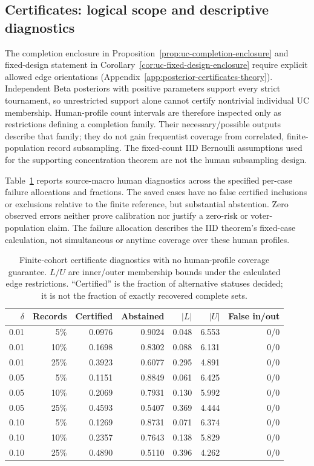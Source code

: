 \subsection{Certificates: logical scope and descriptive diagnostics}
The completion enclosure in Proposition~\ref{prop:uc-completion-enclosure} and fixed-design statement in Corollary~\ref{cor:uc-fixed-design-enclosure} require explicit allowed edge orientations (Appendix~\ref{app:posterior-certificates-theory}). Independent Beta posteriors with positive parameters support every strict tournament, so unrestricted support alone cannot certify nontrivial individual UC membership. Human-profile count intervals are therefore inspected only as restrictions defining a completion family. Their necessary/possible outputs describe that family; they do not gain frequentist coverage from correlated, finite-population record subsampling. The fixed-count IID Bernoulli assumptions used for the supporting concentration theorem are not the human subsampling design.

Table~\ref{tab:posterior-native-certificates} reports source-macro human diagnostics across the specified per-case failure allocations and fractions. The saved cases have no false certified inclusions or exclusions relative to the finite reference, but substantial abstention. Zero observed errors neither prove calibration nor justify a zero-risk or voter-population claim. The failure allocation describes the IID theorem's fixed-case calculation, not simultaneous or anytime coverage over these human profiles.
\begin{table}[ht]\centering\footnotesize
\begin{tabular*}{\linewidth}{@{\extracolsep{\fill}}rrrrrrr@{}}\toprule
$\delta$ & Records & Certified & Abstained & $|L|$ & $|U|$ & False in/out\\\midrule
0.01 & 5\% & 0.0976 & 0.9024 & 0.048 & 6.553 & 0/0\\
0.01 & 10\% & 0.1698 & 0.8302 & 0.088 & 6.131 & 0/0\\
0.01 & 25\% & 0.3923 & 0.6077 & 0.295 & 4.891 & 0/0\\
0.05 & 5\% & 0.1151 & 0.8849 & 0.061 & 6.425 & 0/0\\
0.05 & 10\% & 0.2069 & 0.7931 & 0.130 & 5.992 & 0/0\\
0.05 & 25\% & 0.4593 & 0.5407 & 0.369 & 4.444 & 0/0\\
0.10 & 5\% & 0.1269 & 0.8731 & 0.071 & 6.374 & 0/0\\
0.10 & 10\% & 0.2357 & 0.7643 & 0.138 & 5.829 & 0/0\\
0.10 & 25\% & 0.4890 & 0.5110 & 0.396 & 4.262 & 0/0\\
\bottomrule\end{tabular*}
\caption{Finite-cohort certificate diagnostics with no human-profile coverage guarantee. $L/U$ are inner/outer membership bounds under the calculated edge restrictions. ``Certified'' is the fraction of alternative statuses decided; it is not the fraction of exactly recovered complete sets.}\label{tab:posterior-native-certificates}\end{table}

